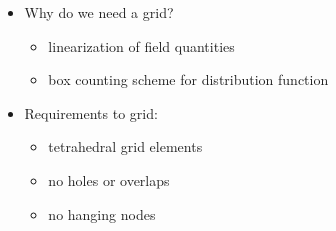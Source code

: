 \documentclass{beamer}
\begin{document}
\begin{frame}
\begin{columns}[onlytextwidth]
\begin{column}{0.37\textwidth}
\begin{center}
		\end{center}	
	\end{column}
	\begin{column}{0.63\textwidth}
		\begin{itemize}
			\item Why do we need a grid?\\
			\begin{itemize}
				\item linearization of field quantities\\
				\item box counting scheme for distribution function
			\end{itemize}
			\item Requirements to grid:
			\begin{itemize}
				\item tetrahedral grid elements
				\item no holes or overlaps
				\item no hanging nodes
			\end{itemize}
		\end{itemize}
	\end{column}
\end{columns}
\end{frame}


\end{document}
